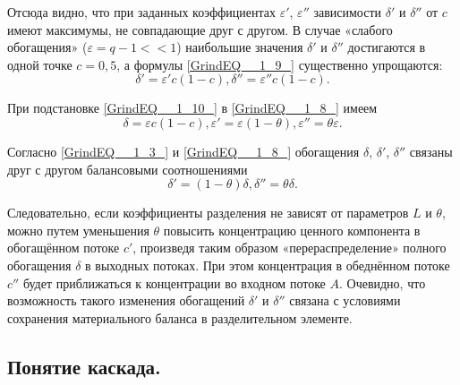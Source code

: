 Отсюда видно, что при заданных коэффициентах $\varepsilon '$, $\varepsilon ''$ зависимости $\delta '$ и $\delta ''$ от $c$ имеют максимумы, не совпадающие друг с другом. В случае «слабого обогащения» ($\varepsilon =q-1<<1$) наибольшие значения $\delta '$ и $\delta ''$ достигаются в одной точке $c=0,5$, а формулы \ref{GrindEQ__1_9_} существенно упрощаются:
\begin{equation} \label{GrindEQ__1_10_} 
\delta '=\varepsilon 'c(1-c),  \delta ''=\varepsilon ''c(1-c).              
\end{equation} 

При подстановке \ref{GrindEQ__1_10_} в \ref{GrindEQ__1_8_} имеем
\begin{equation} \label{GrindEQ__1_11_} 
\delta =\varepsilon c(1-c),  \varepsilon '=\varepsilon (1-\theta ), \varepsilon ''=\theta \varepsilon .    
\end{equation} 

Согласно \ref{GrindEQ__1_3_} и \ref{GrindEQ__1_8_} обогащения $\delta $, $\delta '$, $\delta ''$ связаны друг с другом балансовыми соотношениями
\begin{equation} \label{GrindEQ__1_12_} 
\delta '=(1-\theta )\delta ,  \delta ''=\theta \delta .                             
\end{equation} 

Следовательно, если коэффициенты разделения не зависят от параметров $L$ и $\theta $, можно путем уменьшения $\theta $ повысить концентрацию ценного компонента в обогащённом потоке $c'$, произведя таким образом «перераспределение» полного обогащения $\delta $ в выходных потоках. При этом концентрация в обеднённом потоке $c''$ будет приближаться к концентрации во входном потоке $A$. Очевидно, что возможность такого изменения обогащений $\delta '$ и $\delta ''$ связана с условиями сохранения материального баланса в разделительном элементе.

\subsection{Понятие каскада.}


